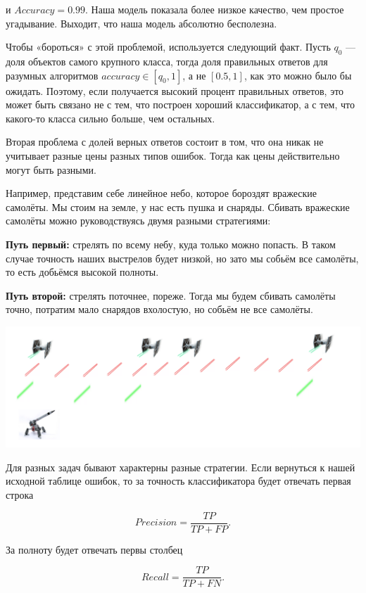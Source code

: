 \documentclass[12pt, a4paper, oneside]{article}
\begin{document}
{\begin{enumerate}
и $Accuracy = 0.99$. Наша модель показала более низкое качество, чем простое угадывание. Выходит, что наша модель абсолютно бесполезна. 
 
 Чтобы «бороться» с этой проблемой, используется следующий факт. Пусть $q_0$ — доля объектов самого крупного класса, тогда доля правильных ответов для разумных алгоритмов $accuracy \in [q_0,1]$, а не $[0.5, 1]$, как это можно было бы ожидать. Поэтому, если получается высокий процент правильных ответов, это может быть связано не с тем, что построен хороший классификатор, а с тем, что какого-то класса сильно больше, чем остальных.
		
Вторая проблема с долей верных ответов состоит в том, что она никак не учитывает разные цены разных типов ошибок. Тогда как цены действительно могут быть разными.

Например, представим себе линейное небо, которое бороздят вражеские самолёты. Мы стоим на земле, у нас есть пушка и снаряды. Сбивать вражеские самолёты можно руководствуясь двумя разными стратегиями: 

\textbf{Путь первый:}  стрелять по всему небу, куда только можно попасть. В таком случае точность наших выстрелов будет низкой, но зато мы собьём все самолёты, то есть добьёмся высокой полноты.

\textbf{Путь второй:} стрелять поточнее, пореже. Тогда мы будем сбивать самолёты точно, потратим мало снарядов вхолостую, но собьём не все самолёты. 

\begin{center}
	\includegraphics[width=.79\paperwidth]{fly.png}
\end{center}


Для разных задач бывают характерны разные стратегии. Если вернуться к нашей исходной таблице ошибок, то за точность классификатора будет отвечать первая строка

\[ 
Precision = \frac{TP}{TP + FP}.
\]

За полноту будет отвечать первы столбец

\[Recall = \frac{TP}{TP + FN}.\]


\end{enumerate}}
\end{document}
